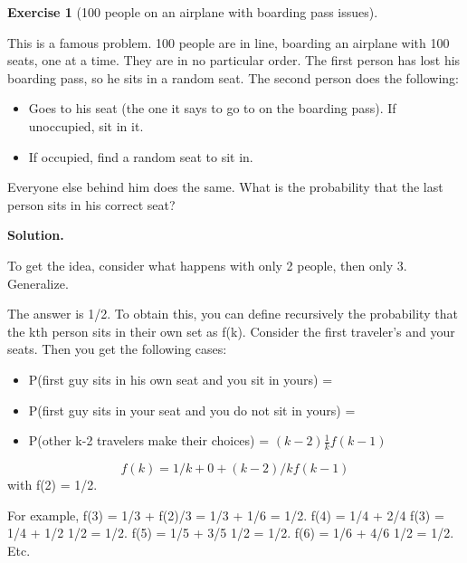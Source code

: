 \documentclass[10pt,]{book}
\theoremstyle{plain}
\theoremstyle{definition}
\theoremstyle{definition}
\theoremstyle{definition}
\newtheorem{exercise}[theorem]{Exercise}
\numberwithin{equation}{section}
\begin{document}
\begin{exercise}[{100 people on an airplane with boarding pass issues}]\label{exercise-22}

	This is a famous problem.  100 people are in line, boarding an airplane with 100 seats, one at a time. They are in no particular order. The first person has lost his boarding pass, so he sits in a random seat. The second person does the following:

	\leavevmode%
\begin{itemize}[label=\textbullet]
\item{}Goes to his seat (the one it says to go to on the boarding pass). If unoccupied, sit in it.%
\item{}If occupied, find a random seat to sit in.%
\end{itemize}

	Everyone else behind him does the same. What is the probability that the last person sits in his correct seat?
\par\smallskip
\noindent\textbf{Solution.}\hypertarget{solution-7}{}\quad

	To get the idea, consider what happens with only 2 people, then only 3. Generalize. 
\par

	The answer is 1/2. To obtain this, you can define recursively the probability that the kth person sits in their own set as f(k).  Consider the first traveler's and your seats. Then you get the following cases:
	\leavevmode%
\begin{itemize}[label=\textbullet]
\item{}P(first guy sits in his own seat and you sit in yours) =  %
\item{}P(first guy sits in your seat and you do not sit in yours) =  %
\item{}P(other k-2 travelers make their choices) = \((k-2) \frac{1}{k} f(k-1)\)%
\end{itemize}

	\begin{equation*}f(k) = 1/k + 0 + (k-2)/k f(k-1)\end{equation*}
	with f(2) = 1/2.
\par

	For example,
	f(3) = 1/3 + f(2)/3 = 1/3 + 1/6 = 1/2.   
	f(4) = 1/4 + 2/4 f(3) = 1/4 + 1/2 1/2 = 1/2.
	f(5) = 1/5 + 3/5 1/2 = 1/2.
	f(6) = 1/6 + 4/6 1/2 = 1/2. Etc.
\end{exercise}
\par
\end{document}
